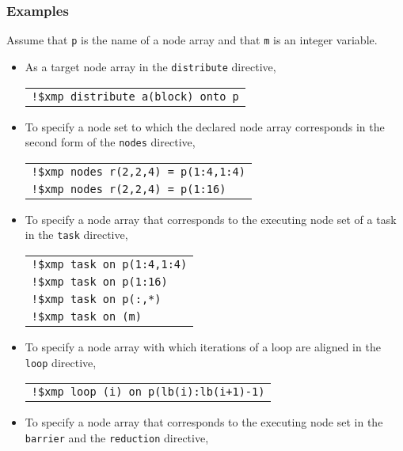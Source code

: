 \subsubsection*{Examples}

Assume that {\tt p} is the name of a node array and that {\tt m} is an
integer variable.

\begin{itemize}
\item As a target node array in the {\tt distribute} directive,

\begin{tabular}{l}
\verb|!$xmp distribute a(block) onto p| \\
\end{tabular}%

\item To specify a node set to which the declared node array corresponds
      in the second form of the {\tt nodes} directive,

\begin{tabular}{l}
\verb|!$xmp nodes r(2,2,4) = p(1:4,1:4)| \\
\verb|!$xmp nodes r(2,2,4) = p(1:16)| \\
\end{tabular}

\item To specify a node array that corresponds to the executing node set
      of a task in the {\tt task} directive,

\begin{tabular}{l}
\verb|!$xmp task on p(1:4,1:4)| \\
\verb|!$xmp task on p(1:16)| \\
\verb|!$xmp task on p(:,*)| \\
\verb|!$xmp task on (m)| \\
\end{tabular}

\item To specify a node array with which iterations of a loop are
      aligned in the {\tt loop} directive,

\begin{tabular}{l}
\verb|!$xmp loop (i) on p(lb(i):lb(i+1)-1)| \\
\end{tabular}%

\item To specify a node array that corresponds to the executing node set
      in the {\tt barrier} and the {\tt reduction} directive,


\end{itemize}

